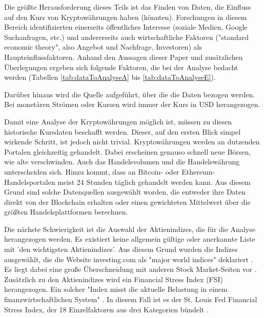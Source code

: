 Die größte Herausforderung dieses Teils ist das Finden von Daten, die Einfluss auf den Kurs von Kryptowährungen haben (könnten). Forschungen in diesem Bereich identifizierten einerseits öffentliches Interesse (soziale Medien, Google Suchanfragen, etc.) und andererseits auch wirtschaftliche Faktoren ("standard economic theory", also Angebot und Nachfrage, Investoren)\citep{kristoufek_what_2015} als Haupteinflussfaktoren. Anhand den Aussagen dieser Paper und zusätzlichen Überlegungen ergeben sich folgende Faktoren, die bei der Analyse bedacht werden (Tabellen \ref{tab:dataToAnalyseA} bis \ref{tab:dataToAnalyseE}).\par Darüber hinaus wird die Quelle aufgeführt, über die die Daten bezogen werden. Bei monetären Strömen oder Kursen wird immer der Kurs in USD herangezogen. 
\par
Damit eine Analyse der Kryptowährungen möglich ist, müssen zu diesen historische Kursdaten beschafft werden. Dieser, auf den ersten Blick simpel wirkende Schritt, ist jedoch nicht trivial. Kryptowährungen werden an dutzenden Portalen gleichzeitig gehandelt. Dabei erscheinen genauso schnell neue Börsen, wie alte verschwinden. Auch das Handelsvolumen und die Handelswährung unterscheiden sich. Hinzu kommt, dass an Bitcoin- oder Ethereum-Handelsportalen meist 24 Stunden täglich gehandelt werden kann. Aus diesem Grund sind solche Datenquellen ausgewählt worden, die entweder ihre Daten direkt von der Blockchain erhalten oder einen gewichteten Mittelwert über die größten Handelsplattformen berechnen.
\par
Die nächste Schwierigkeit ist die Auswahl der Aktienindizes, die für die Analyse herangezogen werden. Es existiert keine allgemein gültige oder anerkannte Liste mit 'den wichtigsten Aktienindizes'. Aus diesem Grund wurden die Indizes ausgewählt, die die Website investing.com als "major world indices" deklariert \citep{fusionmedialimited_major_2017}. Es liegt dabei eine große Überschneidung mit anderen Stock Market-Seiten vor . Zusätzlich zu den Aktienindizes wird ein Financial Stress Index (FSI) herangezogen. Ein solcher "Index misst die aktuelle Belastung in einem finanzwirtschaftlichen System" \citep[S.~1; eigene Übersetzung]{vermeulen_financial_2014}. In diesem Fall ist es der St. Louis Fed Financial Stress Index, der 18 Einzelfaktoren aus drei Kategorien bündelt \citep{federal_reserve_bank_of-st._louis_st._2017}.
\par
